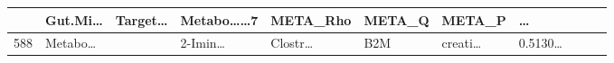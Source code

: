 \documentclass[
]{article}
\begin{document}
\begin{longtable}[]{@{}lllllllllll@{}}
\begin{minipage}[b]{0.09\columnwidth}
\end{minipage} & \begin{minipage}[b]{0.07\columnwidth}\raggedright
Gut.Mi\ldots{}\strut
\end{minipage} & \begin{minipage}[b]{0.07\columnwidth}\raggedright
Target\ldots{}\strut
\end{minipage} & \begin{minipage}[b]{0.09\columnwidth}\raggedright
Metabo\ldots\ldots7\strut
\end{minipage} & \begin{minipage}[b]{0.07\columnwidth}\raggedright
META\_Rho\strut
\end{minipage} & \begin{minipage}[b]{0.07\columnwidth}\raggedright
META\_Q\strut
\end{minipage} & \begin{minipage}[b]{0.07\columnwidth}\raggedright
META\_P\strut
\end{minipage} & \begin{minipage}[b]{0.03\columnwidth}\raggedright
\ldots{}\strut
\end{minipage}\tabularnewline
\midrule
\endhead
\begin{minipage}[t]{0.03\columnwidth}\raggedright
588\strut
\end{minipage} & \begin{minipage}[t]{0.07\columnwidth}\raggedright
Metabo\ldots{}\strut
\end{minipage} & \begin{minipage}[t]{0.07\columnwidth}\raggedright
\strut
\end{minipage} & \begin{minipage}[t]{0.09\columnwidth}\raggedright
2-Imin\ldots{}\strut
\end{minipage} & \begin{minipage}[t]{0.07\columnwidth}\raggedright
Clostr\ldots{}\strut
\end{minipage} & \begin{minipage}[t]{0.07\columnwidth}\raggedright
B2M\strut
\end{minipage} & \begin{minipage}[t]{0.09\columnwidth}\raggedright
creati\ldots{}\strut
\end{minipage} & \begin{minipage}[t]{0.07\columnwidth}\raggedright
0.5130\ldots{}\strut
\end{minipage} & \begin{minipage}[t]{0.07\columnwidth}\raggedright

\end{minipage}
\end{longtable}
\end{document}
